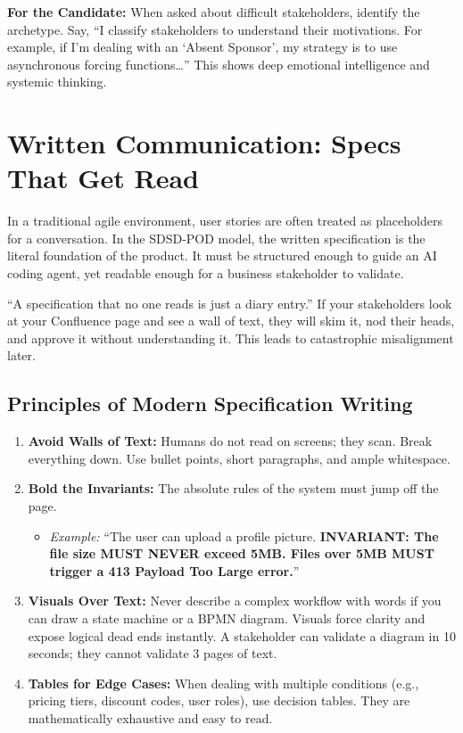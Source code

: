 \documentclass[
  11pt,
  openany,
  oneside]{book}
\providecommand{\tightlist}{%
  \setlength{\itemsep}{0pt}\setlength{\parskip}{0pt}}
\renewenvironment{quote}{\begin{customquote}}{\end{customquote}}
\begin{document}
\begin{quote}
\textbf{For the Candidate:} When asked about difficult stakeholders,
identify the archetype. Say, ``I classify stakeholders to understand
their motivations. For example, if I'm dealing with an `Absent Sponsor',
my strategy is to use asynchronous forcing functions\ldots{}'' This
shows deep emotional intelligence and systemic thinking.
\end{quote}

\bigskip

\section{Written Communication: Specs That Get
Read}\label{written-communication-specs-that-get-read}

In a traditional agile environment, user stories are often treated as
placeholders for a conversation. In the SDSD-POD model, the written
specification is the literal foundation of the product. It must be
structured enough to guide an AI coding agent, yet readable enough for a
business stakeholder to validate.

``A specification that no one reads is just a diary entry.'' If your
stakeholders look at your Confluence page and see a wall of text, they
will skim it, nod their heads, and approve it without understanding it.
This leads to catastrophic misalignment later.

\subsection{Principles of Modern Specification
Writing}\label{principles-of-modern-specification-writing}

\begin{enumerate}
\def\labelenumi{\arabic{enumi}.}
\tightlist
\item
  \textbf{Avoid Walls of Text:} Humans do not read on screens; they
  scan. Break everything down. Use bullet points, short paragraphs, and
  ample whitespace.
\item
  \textbf{Bold the Invariants:} The absolute rules of the system must
  jump off the page.

  \begin{itemize}
  \tightlist
  \item
    \emph{Example:} ``The user can upload a profile picture.
    \textbf{INVARIANT: The file size MUST NEVER exceed 5MB. Files over
    5MB MUST trigger a 413 Payload Too Large error.}''
  \end{itemize}
\item
  \textbf{Visuals Over Text:} Never describe a complex workflow with
  words if you can draw a state machine or a BPMN diagram. Visuals force
  clarity and expose logical dead ends instantly. A stakeholder can
  validate a diagram in 10 seconds; they cannot validate 3 pages of
  text.
\item
  \textbf{Tables for Edge Cases:} When dealing with multiple conditions
  (e.g., pricing tiers, discount codes, user roles), use decision
  tables. They are mathematically exhaustive and easy to read.
\end{enumerate}
\end{document}
